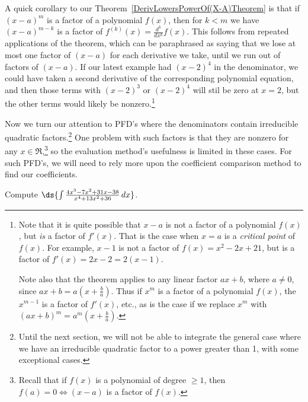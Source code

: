 A quick corollary to our Theorem~\ref{DerivLowersPowerOf(X-A)Theorem} 
is that if
$(x-a)^m$ is a factor of a polynomial $f(x)$, then for $k<m$ we have
$(x-a)^{m-k}$ is a factor of $f^{(k)}(x)=\frac{d^k}{dx^k}f(x)$.
This follows from repeated applications of the theorem, which 
can be paraphrased as saying that we lose at most one factor of $(x-a)$
for each derivative we take, until we run out of factors of
$(x-a)$.  If our latest example had $(x-2)^4$ in the denominator,
we could have taken a second derivative of the corresponding
polynomial equation, and then those terms with 
$(x-2)^3$ or $(x-2)^4$ will stil be zero at $x=2$, but the 
other terms would likely be nonzero.\footnote{%
Note that it is quite possible that $x-a$ is not a factor of 
a polynomial $f(x)$, but {\it is} a factor of $f'(x)$.  
That is the case when $x=a$ is a {\it critical point} of
$f(x)$. For example, $x-1$ is not a factor of $f(x)=x^2-2x+21$,
but is a factor of $f'(x)=2x-2=2(x-1)$.

Note also that the theorem applies to any linear factor $ax+b$,
where $a\ne0$, since $ax+b=a\left(x+\frac{b}a\right)$.
Thus if $x^m$ is a factor of a polynomial $f(x)$, 
the $x^{m-1}$ is a factor of $f'(x)$, etc., as is the 
case if we replace $x^m$ with $(ax+b)^m=a^m\left(x+\frac{b}a\right)$.
}


Now we turn our attention to PFD's where the denominators contain
irreducible quadratic factors.\footnote{%
 Until the next section, we will
not be able to integrate the general case where we have an 
irreducible quadratic factor to a power greater than 1,
with some exceptional cases.  
}
One problem with such factors is that they are nonzero for 
any $x\in\Re$,\footnote{%
Recall that if $f(x)$ is a polynomial of degree $\ge1$,
then $f(a)=0\iff (x-a)$ is a factor of $f(x)$.
}
so the evaluation method's usefulness is limited in these cases.
For such PFD's, we will need to rely more upon the coefficient
comparison method to find our coefficients.

\bex Compute $\ds{\int\frac{4x^3-7x^2+31x-38}{x^4+13x^2+36}\,dx}$.

